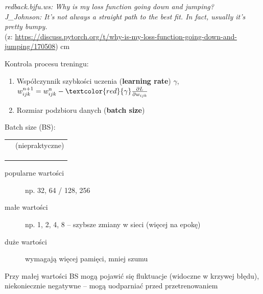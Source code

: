 \documentclass[11pt, xcolor={dvipsnames,svgnames},aspectratio=169]{beamer}
\theoremstyle{plain}
\begin{document}
\begin{frame}
	
	{\footnotesize
		\emph{	redback.bjfu.ws: Why is my loss function going down and jumping?\\
			J\_Johnson: It’s not always a straight path to the best fit. In fact, usually it’s pretty bumpy. }\\
		(z: \url{https://discuss.pytorch.org/t/why-is-my-loss-function-going-down-and-jumping/170508})
	}
	 cm
	
	Kontrola procesu treningu:
	\begin{enumerate}
		\item Współczynnik szybkości uczenia (\textbf{learning rate}) $\gamma$, $w_{ijk}^{n+1} = w_{ijk}^{n} - \textcolor{red}{\gamma} \frac{\partial L}{\partial w_{ijk}}$
		\item Rozmiar podzbioru danych (\textbf{batch size})
	\end{enumerate}
\end{frame}

\begin{frame}
	Batch size (BS):\\
	\begin{tabular}{ll}
	\st{\newmoon\newmoon\newmoon\newmoon\newmoon\newmoon\newmoon\newmoon\newmoon\newmoon\newmoon\newmoon} & (niepraktyczne)\\
	\fullmoon\newmoon\fullmoon\fullmoon\fullmoon\fullmoon\fullmoon\fullmoon\fullmoon\fullmoon\fullmoon\fullmoon & \\
	\fullmoon\fullmoon\fullmoon\fullmoon\fullmoon\fullmoon\fullmoon\fullmoon\newmoon\newmoon\fullmoon\fullmoon & \\
	\fullmoon\fullmoon\fullmoon\fullmoon\newmoon\newmoon\newmoon\newmoon\fullmoon\fullmoon\fullmoon\fullmoon & 
	\end{tabular}
	\vskip 0.3cm
	\begin{description}
		\item[popularne wartości] np. 32, 64 / 128, 256
		\item[małe wartości] np. 1, 2, 4, 8 -- szybsze zmiany w sieci (więcej na epokę)%
		\item[duże wartości] wymagają więcej pamięci, mniej szumu
	\end{description}
	\vskip 0.3cm
	Przy małej wartości BS mogą pojawić się fluktuacje (widoczne w krzywej błędu), niekoniecznie negatywne -- mogą uodparniać przed przetrenowaniem
\end{frame}
\end{document}
